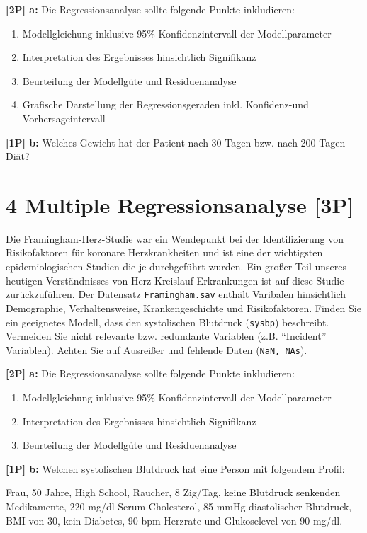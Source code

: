 \documentclass[
]{article}
\providecommand{\tightlist}{%
  \setlength{\itemsep}{0pt}\setlength{\parskip}{0pt}}
\begin{document}
\textbf{{[}2P{]} a:} Die Regressionsanalyse sollte folgende Punkte
inkludieren:

\begin{enumerate}
\def\labelenumi{\roman{enumi})}
\tightlist
\item
  Modellgleichung inklusive 95\% Konfidenzintervall der Modellparameter
\item
  Interpretation des Ergebnisses hinsichtlich Signifikanz
\item
  Beurteilung der Modellgüte und Residuenanalyse
\item
  Grafische Darstellung der Regressionsgeraden inkl. Konfidenz-und
  Vorhersageintervall
\end{enumerate}

\textbf{{[}1P{]} b:} Welches Gewicht hat der Patient nach 30 Tagen bzw.
nach 200 Tagen Diät?

\hypertarget{multiple-regressionsanalyse-3p}{%
\section{4 Multiple Regressionsanalyse
{[}3P{]}}\label{multiple-regressionsanalyse-3p}}

Die Framingham-Herz-Studie war ein Wendepunkt bei der Identifizierung
von Risikofaktoren für koronare Herzkrankheiten und ist eine der
wichtigsten epidemiologischen Studien die je durchgeführt wurden. Ein
großer Teil unseres heutigen Verständnisses von
Herz-Kreislauf-Erkrankungen ist auf diese Studie zurückzuführen. Der
Datensatz \texttt{Framingham.sav} enthält Varibalen hinsichtlich
Demographie, Verhaltensweise, Krankengeschichte und Risikofaktoren.
Finden Sie ein geeignetes Modell, dass den systolischen Blutdruck
(\texttt{sysbp}) beschreibt. Vermeiden Sie nicht relevante bzw.
redundante Variablen (z.B. ``Incident'' Variablen). Achten Sie auf
Ausreißer und fehlende Daten (\texttt{NaN,\ NA\textquotesingle{}s}).

\textbf{{[}2P{]} a:} Die Regressionsanalyse sollte folgende Punkte
inkludieren:

\begin{enumerate}
\def\labelenumi{\roman{enumi})}
\tightlist
\item
  Modellgleichung inklusive 95\% Konfidenzintervall der Modellparameter
\item
  Interpretation des Ergebnisses hinsichtlich Signifikanz
\item
  Beurteilung der Modellgüte und Residuenanalyse
\end{enumerate}

\textbf{{[}1P{]} b:} Welchen systolischen Blutdruck hat eine Person mit
folgendem Profil:

Frau, 50 Jahre, High School, Raucher, 8 Zig/Tag, keine Blutdruck
senkenden Medikamente, 220 mg/dl Serum Cholesterol, 85 mmHg
diastolischer Blutdruck, BMI von 30, kein Diabetes, 90 bpm Herzrate und
Glukoselevel von 90 mg/dl.
\end{document}
